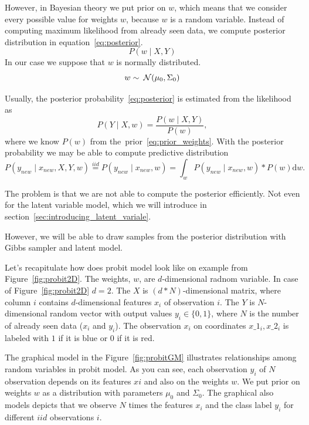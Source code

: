 However, in Bayesian theory we put prior on $w$, which means that we consider every possible value for weights $w$, because $w$ is a random variable. Instead of computing maximum likelihood from already seen data, we compute posterior distribution in equation~\ref{eq:posterior}.
\begin{equation}\label{eq:posterior}
    P(w \mid X, Y) 
\end{equation}
In our case we suppose that $w$ is normally distributed.
\begin{equation}\label{eq:prior_weights}
w \sim \:\mathcal{N}(\mu_0, \Sigma_0)
\end{equation}

Usually, the posterior probability~\ref{eq:posterior} is estimated from the likelihood as
\begin{equation}
    P(Y \mid X, w) = \frac{P(w \mid X,Y)}{P(w)},
\end{equation}
where we know $P(w)$ from the~prior~\ref{eq:prior_weights}.
With the posterior probability we may be able to compute predictive distribution 
\begin{equation}
P(y_{new} \mid x_{new},X, Y, w) \overset{iid}{=} P(y_{new} \mid x_{new}, w) = \int_w P(y_{new} \mid x_{new}, w) * P(w) \mathrm{d} w.
\end{equation}

The problem is that we are not able to compute the posterior efficiently. Not even for the latent variable model, which we will introduce in section~\ref{sec:introducing_latent_variale}.

However, we will be able to draw samples from the posterior distribution with Gibbs sampler and latent model.

Let's recapitulate how does probit model look like on example from Figure~\ref{fig:probit2D}.
The weights, $w$, are $d$-dimensional radnom variable. In case of Figure~\ref{fig:probit2D} $d=2$.
The $X$ is $(d*N)$-dimensional matrix, where column $i$ contains $d$-dimensional features $x_i$ of observation $i$.
The $Y$ is $N$-dimensional random vector with output values $y_i \in \{0,1\}$, where $N$ is the number of already seen data ($x_i$ and $y_i$).
The observation $x_i$ on coordinates $x\_1_i,x\_2_i$ is labeled with $1$ if it is blue or $0$ if it is red.

The graphical model in the Figure~\ref{fig:probitGM} illustrates relationships among random variables in probit model. As you can see, each observation $y_i$ of $N$ observation depends on its features $xi$ and also on the weights $w$. We put prior on weights $w$ as a distribution with parameters $\mu_0$ and $\Sigma_0$. The graphical also models depicts that we observe $N$ times the features $x_i$ and the class label $y_i$ for different $iid$ observations $i$.

